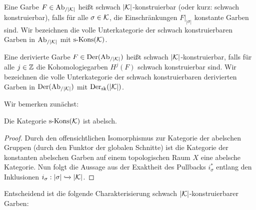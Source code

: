 
\begin{defn}
  Eine Garbe $F \in \operatorname{Ab}_{/|\mathcal{K}|}$ heißt schwach $|\mathcal{K}|$-konstruierbar (oder
  kurz: schwach konstruierbar), falls für alle $\sigma \in \mathcal{K}$, die
  Einschränkungen $F|_{|\sigma|}$ konstante Garben sind. Wir
  bezeichnen die volle Unterkategorie der schwach konstruierbaren
  Garben in $\operatorname{Ab}_{/|\mathcal{K}|}$ mit $\operatorname{s-Kons}(\mathcal{K})$.

  Eine derivierte Garbe $F \in \operatorname{Der}(\operatorname{Ab}_{/|\mathcal{K}|})$ heißt schwach
  $|\mathcal{K}|$-konstruierbar, falls für alle $j \in \mathbb{Z}$ die
  Kohomologiegarben $H^j(F)$ schwach konstruierbar sind. Wir
  bezeichnen die volle Unterkategorie der schwach konstruierbaren
  derivierten Garben in $\operatorname{Der}(\operatorname{Ab}_{/|\mathcal{K}|})$ mit $\operatorname{Der}_{\mathrm{sk}}(|\mathcal{K}|)$.
\end{defn}

Wir bemerken zunächst:

\begin{lemma}
  Die Kategorie $\operatorname{s-Kons}(\mathcal{K})$ ist abelsch.
\end{lemma}
\begin{proof}
  Durch den offensichtlichen Isomorphismus zur Kategorie der abelschen
  Gruppen (durch den Funktor der globalen Schnitte) ist die Kategorie
  der konstanten abelschen Garben auf einem topologischen Raum $X$
  eine abelsche Kategorie. Nun folgt die Aussage aus der Exaktheit des
  Pullbacks $i_{\sigma}^*$ entlang den Inklusionen $i_{\sigma}:
  |\sigma| \xhookrightarrow{} |\mathcal{K}|$.
\end{proof}

Entscheidend ist die folgende Charakterisierung schwach
$|\mathcal{K}|$-konstruierbarer Garben:

